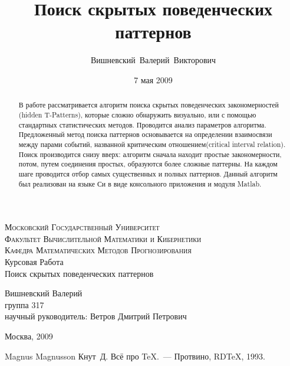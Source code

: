 \documentclass[12pt]{article}
\title{Поиск скрытых поведенческих паттернов}
\author{Вишневский~Валерий~Викторович}
\date{7 мая 2009}
\begin{document}
\begin{titlepage}
  \begin{center}
  \textsc{\large{Московский Государственный Университет}
  \\[.5cm]
  \normalsize{Факультет Вычислительной Математики и Кибернетики\\
  Кафедра Математических Методов Прогнозирования}}
  \\[4cm]
 
  \large{Курсовая Работа }\\[1.5cm]
 
  {\Large {Поиск скрытых поведенческих паттернов}} \\[3cm]
  \begin{flushright}
    Вишневский Валерий\\
    группа 317\\
    научный руководитель: Ветров Дмитрий Петрович
  \end{flushright}
  \vfill
  
  Москва, 2009
  \end{center}
 \end{titlepage}



\begin{abstract}
В работе рассматривается алгоритм поиска скрытых поведенческих закономерностей (hidden T-Patterns), которые сложно обнаружить визуально, 
или с помощью стандартных статистических методов. 
Проводится анализ параметров алгоритма. Предложенный метод поиска паттернов основывается на определении взаимосвязи между парами событий, 
 названной критическим отношением(critical interval relation). Поиск производится снизу вверх: алгоритм сначала находит простые
закономерности, потом, путем соединения простых, образуются более сложные паттерны. На каждом шаге проводится отбор самых существенных и полных паттернов.
Данный алгоритм был реализован на языке Си в виде консольного приложения и модуля Matlab.
\end{abstract}
\newpage
\tableofcontents
\newpage


\newpage
\begin{thebibliography}{00} %
Magnus Magnusson
Кнут~Д. Всё про \TeX.~--- Протвино, RD\TeX, 1993.
\end{thebibliography}
\end{document}
